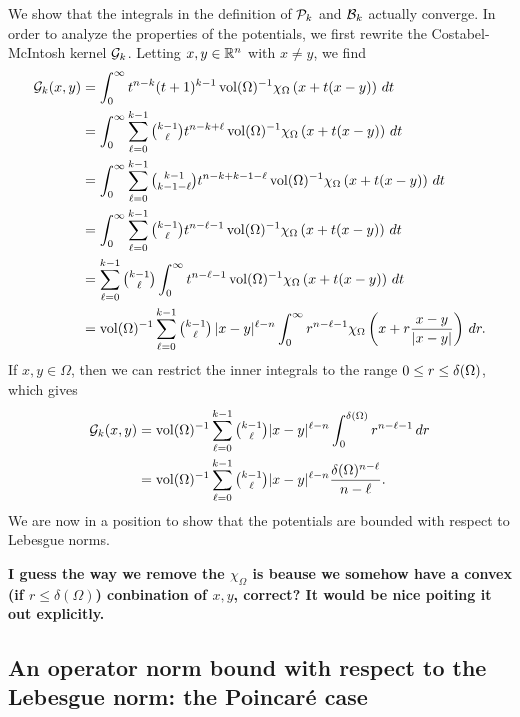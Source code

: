 \documentclass[10pt,a4paper]{article}
\newcommand{\todo}[1]{{\color{RedOrange}\textbf{#1}}}
\begin{document}
We show that the integrals in the definition of ${\mathcal P}_{k}$ and ${\mathcal B}_{k}$ actually converge. 
In order to analyze the properties of the potentials,
we first rewrite the Costabel-McIntosh kernel ${\mathcal G}_{k}$.
Letting $x,y \in {\mathbb R}^n$ with $x \neq y$, we find 
\begin{align*}
    {\mathcal G}_{k}(x,y) 
    &= 
    \int_{0}^{\infty} t^{n-k} (t+1)^{k-1} \operatorname{vol}(\Omega)^{-1} \chi_{\Omega} \left( x+t(x-y) \right)\,dt
    \\
    &= 
    \int_{0}^{\infty} \sum_{\ell=0}^{k-1} \tbinom{k-1}{\ell} t^{n-k+\ell} \operatorname{vol}(\Omega)^{-1} \chi_{\Omega} \left( x+t(x-y) \right)\,dt
    \\
    &= 
    \int_{0}^{\infty} \sum_{\ell=0}^{k-1} \tbinom{k-1}{k-1-\ell} t^{n-k+k-1-\ell} \operatorname{vol}(\Omega)^{-1} \chi_{\Omega} \left( x+t(x-y) \right)\,dt
    \\
    &= 
    \int_{0}^{\infty} \sum_{\ell=0}^{k-1} \tbinom{k-1}{\ell} t^{n-\ell-1} \operatorname{vol}(\Omega)^{-1} \chi_{\Omega} \left( x+t(x-y) \right)\,dt
    \\
    &= 
    \sum_{\ell=0}^{k-1} \tbinom{k-1}{\ell} \int_{0}^{\infty} t^{n-\ell-1} \operatorname{vol}(\Omega)^{-1} \chi_{\Omega}\left( x+t(x-y) \right)\,dt 
    \\
    &= 
    \operatorname{vol}(\Omega)^{-1} \sum_{\ell=0}^{k-1} \tbinom{k-1}{\ell} \, |x-y|^{\ell-n} \int_{0}^{\infty} r^{n-\ell-1} \chi_{\Omega}\left(x+r\frac{x-y}{|x-y|}\right)\,dr
    .
\end{align*}
If $x, y \in \Omega$, then we can restrict the inner integrals to the range $0 \leq r \leq {\delta}(\Omega)$, which gives 
\begin{align*}
    {\mathcal G}_{k}(x,y) 
    &= 
    \operatorname{vol}(\Omega)^{-1} \sum_{\ell=0}^{k-1}\tbinom{k-1}{\ell} |x-y|^{\ell-n} \int_{0}^{{\delta}(\Omega)} r^{n-\ell-1} \,dr 
    \\
    &= 
    \operatorname{vol}(\Omega)^{-1} \sum_{\ell=0}^{k-1}\tbinom{k-1}{\ell} |x-y|^{\ell-n} \frac{ {\delta}(\Omega)^{n-\ell} }{n-\ell}.
\end{align*}
We are now in a position to show that the potentials are bounded with respect to Lebesgue norms. 

\todo{I guess the way we remove the $\chi_\Omega$ is beause we somehow have a convex (if $r \leq \delta(\Omega)$) conbination
of $x,y$, correct? It would be nice poiting it out explicitly.}


\subsection{An operator norm bound with respect to the Lebesgue norm: the Poincar\'e case}
\end{document}
